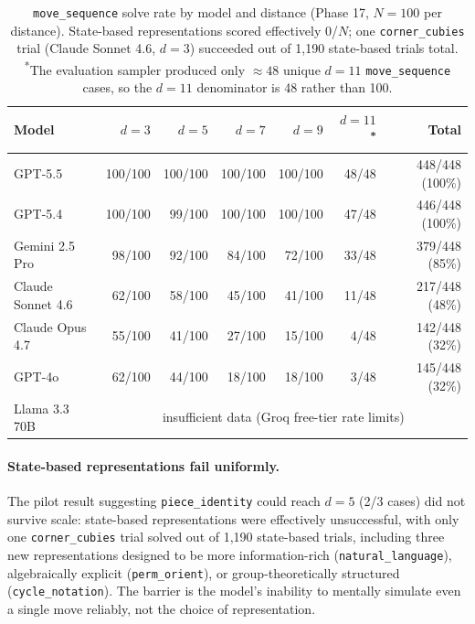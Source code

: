 \documentclass[12pt]{article}
\begin{document}
\begin{table}[h]
\centering
\small
\begin{tabular}{lrrrrrr}
\toprule
Model & $d{=}3$ & $d{=}5$ & $d{=}7$ & $d{=}9$ & $d{=}11$\textsuperscript{*} & Total \\
\midrule
GPT-5.5          & 100/100 & 100/100 & 100/100 & 100/100 & 48/48 & 448/448 (100\%) \\
GPT-5.4          & 100/100 &  99/100 & 100/100 & 100/100 & 47/48 & 446/448 (100\%) \\
Gemini 2.5 Pro   &  98/100 &  92/100 &  84/100 &  72/100 & 33/48 & 379/448 (85\%) \\
Claude Sonnet 4.6 &  62/100 &  58/100 &  45/100 &  41/100 & 11/48 & 217/448 (48\%) \\
Claude Opus 4.7  &  55/100 &  41/100 &  27/100 &  15/100 &  4/48 & 142/448 (32\%) \\
GPT-4o           &  62/100 &  44/100 &  18/100 &  18/100 &  3/48 & 145/448 (32\%) \\
Llama 3.3 70B    & \multicolumn{6}{c}{insufficient data (Groq free-tier rate limits)} \\
\bottomrule
\end{tabular}
\caption{\texttt{move\_sequence} solve rate by model and distance (Phase 17,
$N{=}100$ per distance).  State-based representations scored effectively 0/$N$;
one \texttt{corner\_cubies} trial (Claude Sonnet 4.6, $d{=}3$) succeeded out
of 1,190 state-based trials total.
\textsuperscript{*}The evaluation sampler produced only ${\approx}48$ unique
$d{=}11$ \texttt{move\_sequence} cases, so the $d{=}11$ denominator is 48
rather than 100.}
\label{tab:reps-auto}
\end{table}

\paragraph{State-based representations fail uniformly.}
The pilot result suggesting \texttt{piece\_identity} could reach $d{=}5$ (2/3
cases) did not survive scale: state-based representations were effectively
unsuccessful, with only one \texttt{corner\_cubies} trial solved out of 1,190
state-based trials, including three new representations designed
to be more information-rich (\texttt{natural\_language}), algebraically explicit
(\texttt{perm\_orient}), or group-theoretically structured (\texttt{cycle\_notation}).
The barrier is the model's inability to mentally simulate even a single move
reliably, not the choice of representation.
\end{document}
